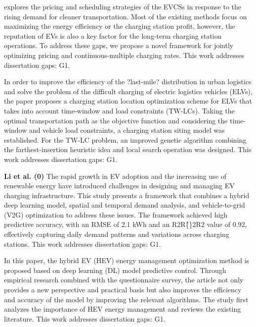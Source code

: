\documentclass[letterpaper, 12pt, oneside, doublespacing]{Thesis}
\begin{document}
\noindent \cite{beyond_profit_2024} explores the pricing and scheduling strategies of the EVCSs in response to the rising demand for cleaner transportation. Most of the existing methods focus on maximizing the energy efficiency or the charging station profit, however, the reputation of EVs is also a key factor for the long-term charging station operations. To address these gaps, we propose a novel framework for jointly optimizing pricing and continuous-multiple charging rates. This work addresses dissertation gaps: G1.



\noindent In order to improve the efficiency of the ?last-mile? distribution in urban logistics and solve the problem of the difficult charging of electric logistics vehicles (ELVs), the paper \cite{charging_station_2024} proposes a charging station location optimization scheme for ELVs that takes into account time-window and load constraints (TW-LCs). Taking the optimal transportation path as the objective function and considering the time-window and vehicle load constraints, a charging station siting model was established. For the TW-LC problem, an improved genetic algorithm combining the farthest-insertion heuristic idea and local search operation was designed. This work addresses dissertation gaps: G1.



\noindent \textbf{Li et al. (0)} The rapid growth in EV adoption and the increasing use of renewable energy have introduced challenges in designing and managing EV charging infrastructure. This study presents a framework that combines a hybrid deep learning model, spatial and temporal demand analysis, and vehicle-to-grid (V2G) optimization to address these issues. The framework achieved high predictive accuracy, with an RMSE of 2.1 kWh and an R2R\^\{\}2R2 value of 0.92, effectively capturing daily demand patterns and variations across charging stations. This work addresses dissertation gaps: G1.



\noindent In this paper, the hybrid EV (HEV) energy management optimization method is proposed based on deep learning (DL) model predictive control. Through empirical research combined with the questionnaire survey, the article \cite{energy_management_2024} not only provides a new perspective and practical basis but also improves the efficiency and accuracy of the model by improving the relevant algorithms. The study first analyzes the importance of HEV energy management and reviews the existing literature. This work addresses dissertation gaps: G1.
\end{document}
